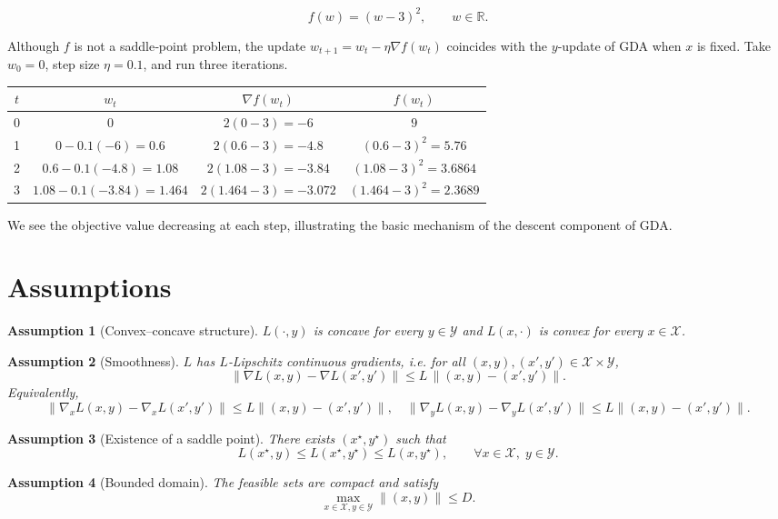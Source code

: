 \documentclass{article}
\newtheorem{assumption}{Assumption}
\newcommand{\R}{\mathbb{R}}
\begin{document}
\[
f(w) = (w-3)^{2},
\qquad w\in\R .
\]

Although $f$ is not a saddle‑point problem, the update $w_{t+1}=w_{t}-\eta \nabla f(w_{t})$ coincides with the $y$‑update of GDA when $x$ is fixed.  
Take $w_{0}=0$, step size $\eta=0.1$, and run three iterations.

\begin{center}
\begin{tabular}{c|c|c|c}
$t$ & $w_{t}$ & $\nabla f(w_{t})$ & $f(w_{t})$ \\ \hline
0 & $0$ & $2(0-3)=-6$ & $9$ \\
1 & $0-0.1(-6)=0.6$ & $2(0.6-3)=-4.8$ & $(0.6-3)^{2}=5.76$ \\
2 & $0.6-0.1(-4.8)=1.08$ & $2(1.08-3)=-3.84$ & $(1.08-3)^{2}=3.6864$ \\
3 & $1.08-0.1(-3.84)=1.464$ & $2(1.464-3)=-3.072$ & $(1.464-3)^{2}=2.3689$
\end{tabular}
\end{center}

We see the objective value decreasing at each step, illustrating the basic mechanism of the descent component of GDA.

\section*{Assumptions}
\begin{assumption}[Convex–concave structure]\label{as:convconc}
$L(\cdot,y)$ is concave for every $y\in\mathcal{Y}$ and $L(x,\cdot)$ is convex for every $x\in\mathcal{X}$.
\end{assumption}
\begin{assumption}[Smoothness]\label{as:smooth}
$L$ has $L$‑Lipschitz continuous gradients, i.e. for all $(x,y),(x',y')\in\mathcal{X}\times\mathcal{Y}$,
\[
\big\|\nabla L(x,y)-\nabla L(x',y')\big\| \le L\,
\big\|(x,y)-(x',y')\big\|.
\]
Equivalently,
\[
\|\nabla_{x}L(x,y)-\nabla_{x}L(x',y')\|\le L\|(x,y)-(x',y')\|,\quad
\|\nabla_{y}L(x,y)-\nabla_{y}L(x',y')\|\le L\|(x,y)-(x',y')\|.
\]
\end{assumption}
\begin{assumption}[Existence of a saddle point]\label{as:saddle}
There exists $(x^{\star},y^{\star})$ such that
\[
L(x^{\star},y)\le L(x^{\star},y^{\star})\le L(x,y^{\star}),\qquad\forall x\in\mathcal{X},\;y\in\mathcal{Y}.
\]
\end{assumption}
\begin{assumption}[Bounded domain]\label{as:bounded}
The feasible sets are compact and satisfy
\[
\max_{x\in\mathcal{X},y\in\mathcal{Y}}\| (x,y)\| \le D .
\]
\end{assumption}
\end{document}
